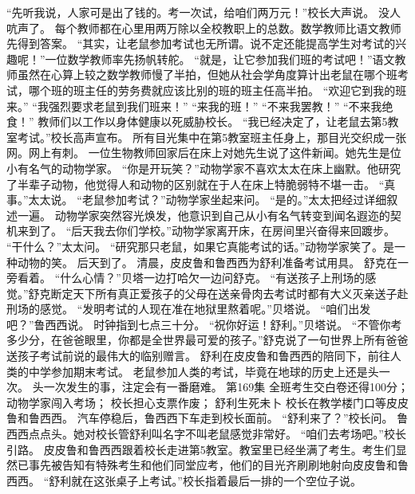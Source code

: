 \documentclass[a4paper,12pt,UTF8,twoside]{ctexbook}
\begin{document}
        “先听我说，人家可是出了钱的。考一次试，给咱们两万元！”校长大声说。 
        没人吭声了。 
        每个教师都在心里用两万除以全校教职上的总数。数学教师比语文教师先得到答案。 
        “其实，让老鼠参加考试也无所谓。说不定还能提高学生对考试的兴趣呢！”一位数学教师率先扬帆转舵。 
        “就是，让它参加我们班的考试吧！”语文教师虽然在心算上较之数学教师慢了半拍，但她从社会学角度算计出老鼠在哪个班考试，哪个班的班主任的劳务费就应该比别的班的班主任高半拍。 
        “欢迎它到我的班来。” 
        “我强烈要求老鼠到我们班来！” 
        “来我的班！” 
        “不来我罢教！” 
        “不来我绝食！” 
        教师们以工作以身体健康以死威胁校长。 
        “我已经决定了，让老鼠去第5教室考试。”校长高声宣布。 
        所有目光集中在第5教室班主任身上，那目光交织成一张网。网上有刺。 
        一位生物教师回家后在床上对她先生说了这件新闻。她先生是位小有名气的动物学家。 
        “你是开玩笑？”动物学家不喜欢太太在床上幽默。他研究了半辈子动物，他觉得人和动物的区别就在于人在床上特脆弱特不堪一击。 
        “真事。”太太说。 
        “老鼠参加考试？”动物学家坐起来问。 
        “是的。”太太把经过详细叙述一遍。 
        动物学家突然容光焕发，他意识到自己从小有名气转变到闻名遐迩的契机来到了。 
        “后天我去你们学校。”动物学家离开床，在房间里兴奋得来回踱步。 
        “干什么？”太太问。 
        “研究那只老鼠，如果它真能考试的话。”动物学家笑了。是一种动物的笑。 
        后天到了。 
        清晨，皮皮鲁和鲁西西为舒利准备考试用具。 
        舒克在一旁看着。 
        “什么心情？”贝塔一边打哈欠一边问舒克。 
        “有送孩子上刑场的感觉。”舒克断定天下所有真正爱孩子的父母在送亲骨肉去考试时都有大义灭亲送子赴刑场的感觉。 
        “发明考试的人现在准在地狱里熬着呢。”贝塔说。 
        “咱们出发吧？”鲁西西说。 
        时钟指到七点三十分。 
        “祝你好运！舒利。”贝塔说。 
        “不管你考多少分，在爸爸眼里，你都是全世界最可爱的孩子。”舒克说了一句世界上所有爸爸送孩子考试前说的最伟大的临别赠言。 
        舒利在皮皮鲁和鲁西西的陪同下，前往人类的中学参加期末考试。 
        老鼠参加人类的考试，毕竟在地球的历史上还是头一次。 
        头一次发生的事，注定会有一番磨难。   第169集 
        全班考生交白卷还得100分； 
        动物学家闯入考场； 
        校长担心支票作废； 
        舒利生死未卜   
        校长在教学楼门口等皮皮鲁和鲁西西。 
        汽车停稳后，鲁西西下车走到校长面前。 
        “舒利来了？”校长问。 
        鲁西西点点头。她对校长管舒利叫名字不叫老鼠感觉非常好。 
        “咱们去考场吧。”校长引路。 
        皮皮鲁和鲁西西跟着校长走进第5教室。教室里已经坐满了考生。考生们显然已事先被告知有特殊考生和他们同堂应考，他们的目光齐刷刷地射向皮皮鲁和鲁西西。 
        “舒利就在这张桌子上考试。”校长指着最后一排的一个空位子说。 
\end{document}
